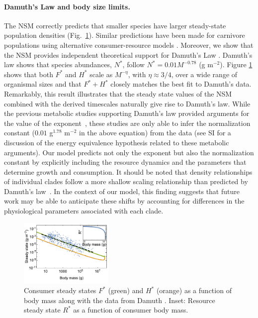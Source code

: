 \documentclass[twocolumn,preprintnumbers,amsmath,amssymb,superscriptaddress]{revtex4}
\begin{document}
\begin{bibunit}[unsrt]
  \noindent \paragraph*{{\bf Damuth's Law and body size limits.}} The NSM
  correctly predicts that smaller species have larger steady-state population
  densities (Fig.~\ref{fig:mass}).  Similar predictions have been made for
  carnivore populations using alternative consumer-resource models
  \citep{DeLong:2012kw}.  Moreover, we show that the NSM provides independent
  theoretical support for Damuth's Law
  \citep{Damuth:1987kr,allen2002,enquist1998,Pedersen:2017he}.  Damuth's
  law shows that species abundances, $N^{*}$, follow $N^*=0.01
  M^{-0.78}$ (g m$^{-2}$). Figure \ref{fig:mass} shows that both $F^{*}$ and $H^{*}$ scale
  as $M^{-\eta}$, with $\eta\approx 3/4$,  over a wide range of organismal sizes and that $F^{*}+H^{*}$
  closely matches the best fit to Damuth's data.  Remarkably, this result
  illustrates that the steady state values of the NSM combined with the derived
  timescales naturally give rise to Damuth's law. While the previous metabolic
  studies supporting Damuth's law provided arguments for the value of the
  exponent~\citep{allen2002}, these studies are only able to infer the
  normalization constant ($0.01$ g$^{1.78}$ m$^{-2}$ in the above equation) from the data (see SI for a discussion of the energy
  equivalence hypothesis related to these metabolic arguments). Our model
  predicts not only the exponent but also the normalization constant by
  explicitly including the resource dynamics and the parameters that determine
  growth and consumption. It should be noted that density relationships of
  individual clades follow a more shallow scaling relationship than predicted
  by Damuth's law~\cite{Pedersen:2017he}.  In the context of our model,
  this finding suggests that future work may be able to anticipate these shifts
  by accounting for differences in the physiological parameters associated with
  each clade.


  \begin{figure}
  \centering
  \includegraphics[width=0.4\textwidth]{fig_FPAllometric2-eps-converted-to.pdf}
  \caption{\small{Consumer steady states $F^*$ (green) and $H^*$ (orange) as a function of
    body mass along with the data from Damuth \citep{Damuth:1987kr}. Inset: Resource steady state $R^*$ as a function of consumer body mass.}\label{fig:mass}}
  \end{figure}


\end{bibunit}
\end{document}
